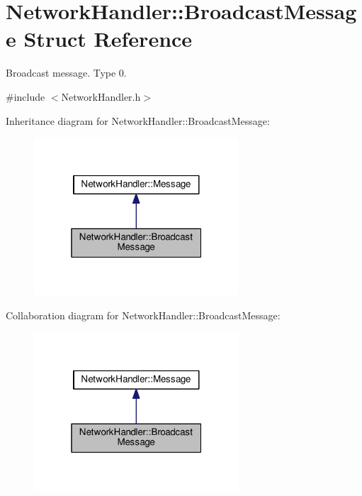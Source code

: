 \hypertarget{structNetworkHandler_1_1BroadcastMessage}{}\section{Network\+Handler\+:\+:Broadcast\+Message Struct Reference}
\label{structNetworkHandler_1_1BroadcastMessage}


Broadcast message. Type 0.  




{\ttfamily \#include $<$Network\+Handler.\+h$>$}



Inheritance diagram for Network\+Handler\+:\+:Broadcast\+Message\+:\nopagebreak
\begin{figure}[H]
\begin{center}
\leavevmode
\includegraphics[width=217pt]{structNetworkHandler_1_1BroadcastMessage__inherit__graph}
\end{center}
\end{figure}


Collaboration diagram for Network\+Handler\+:\+:Broadcast\+Message\+:\nopagebreak
\begin{figure}[H]
\begin{center}
\leavevmode
\includegraphics[width=217pt]{structNetworkHandler_1_1BroadcastMessage__coll__graph}
\end{center}
\end{figure}
